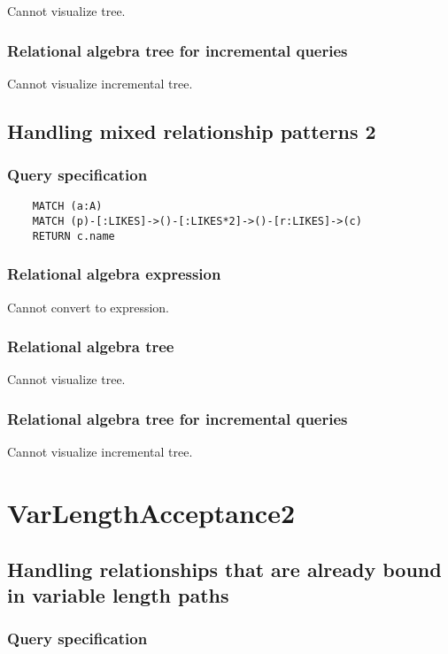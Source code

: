 	Cannot visualize tree.

	\subsubsection*{Relational algebra tree for incremental queries}

	Cannot visualize incremental tree.
	\subsection{Handling mixed relationship patterns 2}

	\subsubsection*{Query specification}

	\begin{lstlisting}
	MATCH (a:A)
	MATCH (p)-[:LIKES]->()-[:LIKES*2]->()-[r:LIKES]->(c)
	RETURN c.name
	\end{lstlisting}


	\subsubsection*{Relational algebra expression}

	Cannot convert to expression.

	\subsubsection*{Relational algebra tree}

	Cannot visualize tree.

	\subsubsection*{Relational algebra tree for incremental queries}

	Cannot visualize incremental tree.

	\section{VarLengthAcceptance2}

	\subsection{Handling relationships that are already bound in variable length paths}

	\subsubsection*{Query specification}

